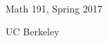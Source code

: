 

	\makeatletter
	\begin{titlingpage}
	\begingroup
	\raggedleft
	\vspace*{1cm}
	{\Huge\textit{ \@title }}\\[1cm]
	{\large Math 191, Spring 2017}\\[0.5cm]
	{\Large \@author}\par
	\vfill
	{\Large  \sffamily UC Berkeley}
	\vspace*{1cm}
	\endgroup
	\end{titlingpage}
	\makeatother
\frontmatter
	\tableofcontents*  %
	\newpage
	\begin{multicols}{2}
		\printnomenclature %
	\end{multicols}
	